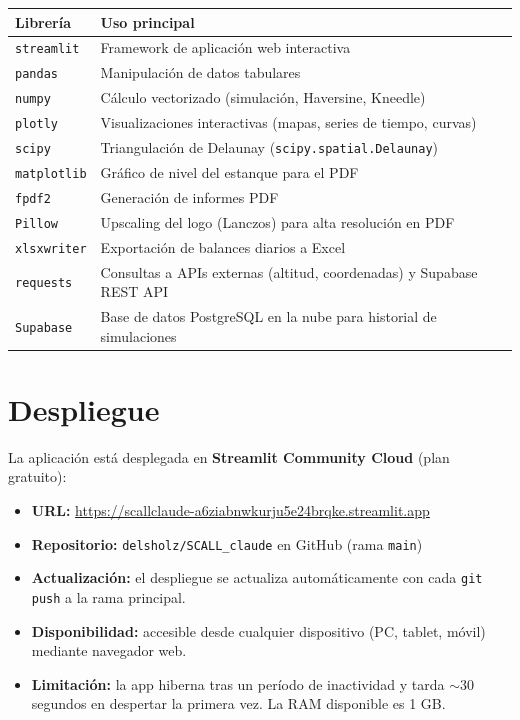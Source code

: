 \documentclass[12pt, a4paper]{article}
\begin{document}
\begin{center}
\begin{tabular}{ll}
\toprule
\textbf{Librería} & \textbf{Uso principal} \\
\midrule
\texttt{streamlit} & Framework de aplicación web interactiva \\
\texttt{pandas} & Manipulación de datos tabulares \\
\texttt{numpy} & Cálculo vectorizado (simulación, Haversine, Kneedle) \\
\texttt{plotly} & Visualizaciones interactivas (mapas, series de tiempo, curvas) \\
\texttt{scipy} & Triangulación de Delaunay (\texttt{scipy.spatial.Delaunay}) \\
\texttt{matplotlib} & Gráfico de nivel del estanque para el PDF \\
\texttt{fpdf2} & Generación de informes PDF \\
\texttt{Pillow} & Upscaling del logo (Lanczos) para alta resolución en PDF \\
\texttt{xlsxwriter} & Exportación de balances diarios a Excel \\
\texttt{requests} & Consultas a APIs externas (altitud, coordenadas) y Supabase REST API \\
\texttt{Supabase} & Base de datos PostgreSQL en la nube para historial de simulaciones \\
\bottomrule
\end{tabular}
\end{center}

\section{Despliegue}

La aplicación está desplegada en \textbf{Streamlit Community Cloud} (plan gratuito):

\begin{itemize}
    \item \textbf{URL:} \url{https://scallclaude-a6ziabnwkurju5e24brqke.streamlit.app}
    \item \textbf{Repositorio:} \texttt{delsholz/SCALL\_claude} en GitHub (rama \texttt{main})
    \item \textbf{Actualización:} el despliegue se actualiza automáticamente con cada \texttt{git push} a la rama principal.
    \item \textbf{Disponibilidad:} accesible desde cualquier dispositivo (PC, tablet, móvil) mediante navegador web.
    \item \textbf{Limitación:} la app hiberna tras un período de inactividad y tarda $\sim$30 segundos en despertar la primera vez. La RAM disponible es 1 GB.
\end{itemize}
\end{document}
